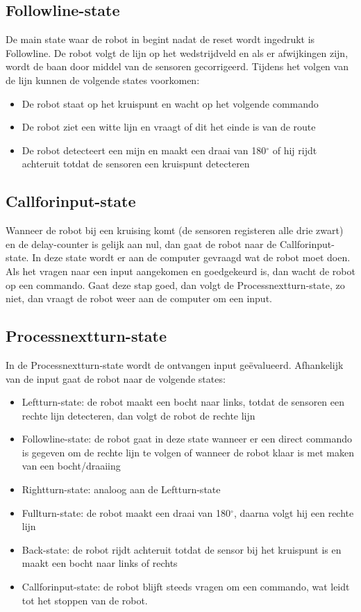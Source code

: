 \documentclass{report}
\begin{document}
\subsection{Followline-state}
De main state waar de robot in begint nadat de reset wordt ingedrukt is Followline.
De robot volgt de lijn op het wedstrijdveld en als er afwijkingen zijn, wordt de baan door middel van de sensoren gecorrigeerd.
Tijdens het volgen van de lijn kunnen de volgende states voorkomen: 
\begin{itemize}
\item De robot staat op het kruispunt en wacht op het volgende commando
\item De robot ziet een witte lijn en vraagt of dit het einde is van de route
\item De robot detecteert een mijn en maakt een draai van 180$^\circ$ of hij rijdt achteruit totdat de sensoren een kruispunt detecteren
\end{itemize}

\subsection{Callforinput-state}
Wanneer de robot bij een kruising komt (de sensoren registeren alle drie zwart) en de delay-counter is gelijk aan nul, dan gaat de robot naar de Callforinput-state.
In deze state wordt er aan de computer gevraagd wat de robot moet doen.
Als het vragen naar een input aangekomen en goedgekeurd is, dan wacht de robot op een commando.
Gaat deze stap goed, dan volgt de Processnextturn-state, zo niet, dan vraagt de robot weer aan de computer om een input.

\subsection{Processnextturn-state}
In de Processnextturn-state wordt de ontvangen input ge\"{e}valueerd.
Afhankelijk van de input gaat de robot naar de volgende states:
\begin{itemize}
\item Leftturn-state: de robot maakt een bocht naar links, totdat de sensoren een rechte lijn detecteren, dan volgt de robot de rechte lijn
\item Followline-state: de robot gaat in deze state wanneer er een direct commando is gegeven om de rechte lijn te volgen of wanneer de robot klaar is met maken van een bocht/draaiing
\item Rightturn-state: analoog aan de Leftturn-state
\item Fullturn-state: de robot maakt een draai van 180$^\circ$, daarna volgt hij een rechte lijn
\item Back-state: de robot rijdt achteruit totdat de sensor bij het kruispunt is en maakt een bocht naar links of rechts
\item Callforinput-state: de robot blijft steeds vragen om een commando, wat leidt tot het stoppen van de robot.
\end{itemize} 
\end{document}
